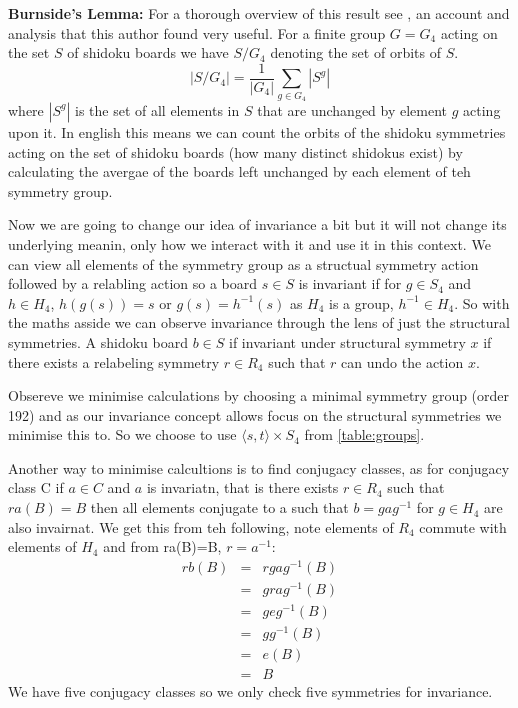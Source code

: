 \documentclass[a4paper,11pt]{report}
\begin{document}
\textbf{Burnside's Lemma:} For a thorough overview of this result see \cite{analysis and applications of burnsides lemma jenny jin}, an account and analysis that this author found very useful. For a finite group $G=G_4$ acting on the set $S$ of shidoku boards we have $S/G_4$ denoting the set of orbits of $S$. 
\begin{equation} |S/G_4|=\frac{1}{|G_4|}\sum_{g\in G_4}|S^g|\end{equation}
where $|S^g|$ is the set of all elements in $S$ that are unchanged by element $g$ acting upon it. In english this means we can count the orbits of the shidoku symmetries acting on the set of shidoku boards (how many distinct shidokus exist) by calculating the avergae of the boards left unchanged by each element of teh symmetry group. 

Now we are going to change our idea of invariance a bit but it will not change its underlying meanin, only how we interact with it and use it in this context. We can view all elements of the symmetry group as a structual symmetry action followed by a relabling action so a board $s\in S$ is invariant if for $g\in S_4$ and $h\in H_4$, $h(g(s))=s$ or $g(s)=h^{-1}(s)$ as $H_4 $ is a group, $h^{-1}\in H_4$. So with the maths asside we can observe invariance through the lens of just the structural symmetries. A shidoku board $b\in S$ if invariant under structural symmetry $x$ if there exists a  relabeling symmetry $r\in R_4$ such that $r$ can undo the action $x$.

Obsereve we minimise calculations by choosing a minimal symmetry group (order 192) and as our invariance concept allows focus on the structural symmetries we minimise this to. So we choose to use $\langle s,t \rangle \times S_4$ from \ref{table:groups}.

Another way to minimise calcultions is to find conjugacy classes, as for conjugacy class C if $a\in C$ and $a$ is invariatn, that is there exists $r\in R_4$ such that$ra(B)=B$ then all elements conjugate to a such that $b=gag^{-1}$ for $g\in H_4$ are also invairnat. We get this from teh following, note elements of $R_4$ commute with elements of $H_4$ and from ra(B)=B, $r=a^{-1}$:
\begin{eqnarray}
rb(B)&=&rgag^{-1}(B)\\
&=&grag^{-1}(B)\\
&=&geg^{-1}(B)\\
&=&gg^{-1}(B)\\
&=&e(B)\\
&=&B
\end{eqnarray}
We have five conjugacy classes so we only check five symmetries for invariance. 
\end{document}
